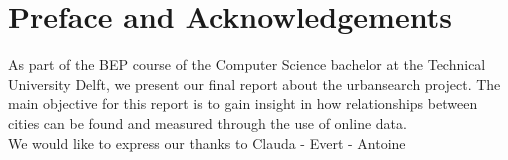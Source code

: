 \chapter*{Preface and Acknowledgements}
As part of the BEP course of the Computer Science bachelor at the Technical University Delft, we present our final report about the urbansearch project. The main objective for this report is to gain insight in how relationships between cities can be found and measured through the use of online data.\\







We would like to express our thanks to Clauda - Evert - Antoine